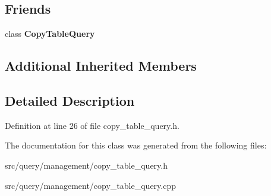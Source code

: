 \subsection*{Friends}
\begin{DoxyCompactItemize}
\item 
\mbox{\label{class_copy_table_dest_query_ac6745199122174064b06f954a6eb3ec3}} 
class {\bfseries Copy\+Table\+Query}
\end{DoxyCompactItemize}
\subsection*{Additional Inherited Members}


\subsection{Detailed Description}


Definition at line 26 of file copy\+\_\+table\+\_\+query.\+h.



The documentation for this class was generated from the following files\+:\begin{DoxyCompactItemize}
\item 
src/query/management/copy\+\_\+table\+\_\+query.\+h\item 
src/query/management/copy\+\_\+table\+\_\+query.\+cpp\end{DoxyCompactItemize}
